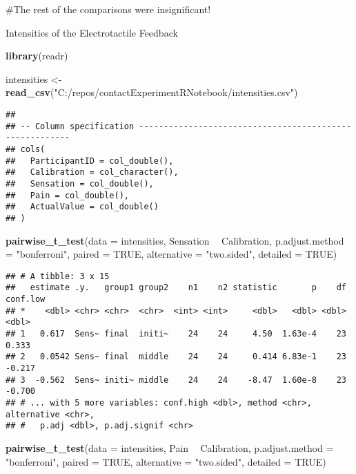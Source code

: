 \documentclass[
]{article}
\newenvironment{Shaded}{\begin{snugshade}}{\end{snugshade}}
\newcommand{\DataTypeTok}[1]{\textcolor[rgb]{0.13,0.29,0.53}{#1}}
\newcommand{\KeywordTok}[1]{\textcolor[rgb]{0.13,0.29,0.53}{\textbf{#1}}}
\newcommand{\NormalTok}[1]{#1}
\newcommand{\OperatorTok}[1]{\textcolor[rgb]{0.81,0.36,0.00}{\textbf{#1}}}
\newcommand{\OtherTok}[1]{\textcolor[rgb]{0.56,0.35,0.01}{#1}}
\newcommand{\StringTok}[1]{\textcolor[rgb]{0.31,0.60,0.02}{#1}}
\begin{document}
\#The rest of the comparisons were insignificant!

Intensities of the Electrotactile Feedback

\begin{Shaded}
\begin{Highlighting}[]
\KeywordTok{library}\NormalTok{(readr)}

\NormalTok{intensities <-}\StringTok{ }\KeywordTok{read_csv}\NormalTok{(}\StringTok{"C:/repos/contactExperimentRNotebook/intensities.csv"}\NormalTok{)}
\end{Highlighting}
\end{Shaded}

\begin{verbatim}
## 
## -- Column specification --------------------------------------------------------
## cols(
##   ParticipantID = col_double(),
##   Calibration = col_character(),
##   Sensation = col_double(),
##   Pain = col_double(),
##   ActualValue = col_double()
## )
\end{verbatim}

\begin{Shaded}
\begin{Highlighting}[]
\KeywordTok{pairwise_t_test}\NormalTok{(}\DataTypeTok{data =}\NormalTok{ intensities, Sensation }\OperatorTok{~}\StringTok{ }\NormalTok{Calibration, }\DataTypeTok{p.adjust.method =} \StringTok{"bonferroni"}\NormalTok{, }\DataTypeTok{paired =} \OtherTok{TRUE}\NormalTok{, }\DataTypeTok{alternative =} \StringTok{"two.sided"}\NormalTok{, }\DataTypeTok{detailed =} \OtherTok{TRUE}\NormalTok{)}
\end{Highlighting}
\end{Shaded}

\begin{verbatim}
## # A tibble: 3 x 15
##   estimate .y.   group1 group2    n1    n2 statistic       p    df conf.low
## *    <dbl> <chr> <chr>  <chr>  <int> <int>     <dbl>   <dbl> <dbl>    <dbl>
## 1   0.617  Sens~ final  initi~    24    24     4.50  1.63e-4    23    0.333
## 2   0.0542 Sens~ final  middle    24    24     0.414 6.83e-1    23   -0.217
## 3  -0.562  Sens~ initi~ middle    24    24    -8.47  1.60e-8    23   -0.700
## # ... with 5 more variables: conf.high <dbl>, method <chr>, alternative <chr>,
## #   p.adj <dbl>, p.adj.signif <chr>
\end{verbatim}

\begin{Shaded}
\begin{Highlighting}[]
\KeywordTok{pairwise_t_test}\NormalTok{(}\DataTypeTok{data =}\NormalTok{ intensities, Pain }\OperatorTok{~}\StringTok{ }\NormalTok{Calibration, }\DataTypeTok{p.adjust.method =} \StringTok{"bonferroni"}\NormalTok{, }\DataTypeTok{paired =} \OtherTok{TRUE}\NormalTok{, }\DataTypeTok{alternative =} \StringTok{"two.sided"}\NormalTok{, }\DataTypeTok{detailed =} \OtherTok{TRUE}\NormalTok{)}
\end{Highlighting}
\end{Shaded}
\end{document}
